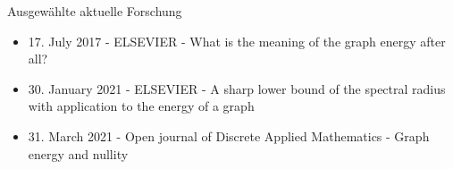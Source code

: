 \documentclass[aspectratio = 169]{beamer}
\begin{document}

\begin{frame}{Ausgewählte aktuelle Forschung}

    \begin{block}

        \begin{itemize}
            \item 17. July 2017 - ELSEVIER - What is the meaning of the graph energy after all?
            \item 30. January 2021 - ELSEVIER - A sharp lower bound of the spectral radius with application to the energy of a graph
            \item 31. March 2021 - Open journal of Discrete Applied Mathematics - Graph energy and nullity
        \end{itemize}
        
    \end{block}

\end{frame}

\end{document}
